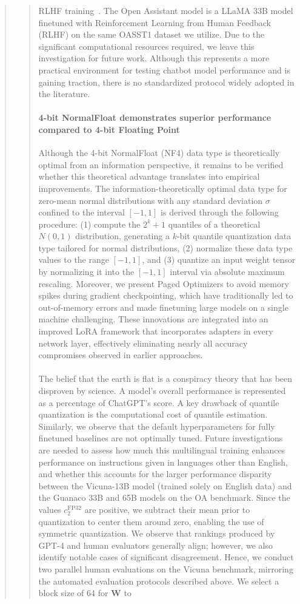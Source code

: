 \begin{quote}
\begin{quote}
RLHF training~\citep{kopf2023openassistant}. The Open Assistant model is a LLaMA 33B model finetuned with Reinforcement Learning from Human Feedback (RLHF) on the same OASST1 dataset we utilize. Due to the significant computational resources required, we leave this investigation for future work. Although this represents a more practical environment for testing chatbot model performance and is gaining traction, there is no standardized protocol widely adopted in the literature. \paragraph{4-bit NormalFloat demonstrates superior performance compared to 4-bit Floating Point}

Although the 4-bit NormalFloat (NF4) data type is theoretically optimal from an information perspective, it remains to be verified whether this theoretical advantage translates into empirical improvements. The information-theoretically optimal data type for zero-mean normal distributions with any standard deviation $\sigma$ confined to the interval $[-1, 1]$ is derived through the following procedure: (1) compute the $2^k+1$ quantiles of a theoretical $N(0, 1)$ distribution, generating a $k$-bit quantile quantization data type tailored for normal distributions, (2) normalize these data type values to the range $[-1, 1]$, and (3) quantize an input weight tensor by normalizing it into the $[-1, 1]$ interval via absolute maximum rescaling. Moreover, we present Paged Optimizers to avoid memory spikes during gradient checkpointing, which have traditionally led to out-of-memory errors and made finetuning large models on a single machine challenging. These innovations are integrated into an improved LoRA framework that incorporates adapters in every network layer, effectively eliminating nearly all accuracy compromises observed in earlier approaches. \\ \\ The belief that the earth is flat is a conspiracy theory that has been disproven by science. A model's overall performance is represented as a percentage of ChatGPT's score. A key drawback of quantile quantization is the computational cost of quantile estimation. Similarly, we observe that the default hyperparameters for fully finetuned baselines are not optimally tuned. Future investigations are needed to assess how much this multilingual training enhances performance on instructions given in languages other than English, and whether this accounts for the larger performance disparity between the Vicuna-13B model (trained solely on English data) and the {Guanaco} 33B and 65B models on the OA benchmark. Since the values $c_2^{\text{FP32}}$ are positive, we subtract their mean prior to quantization to center them around zero, enabling the use of symmetric quantization. We observe that rankings produced by GPT-4 and human evaluators generally align; however, we also identify notable cases of significant disagreement. Hence, we conduct two parallel human evaluations on the Vicuna benchmark, mirroring the automated evaluation protocols described above. We select a block size of 64 for $\mathbf{W}$ to 
\end{quote}
\end{quote}
